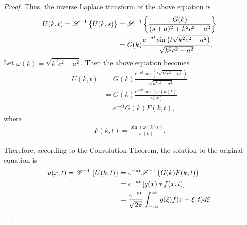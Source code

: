 \begin{proof}
  Thus, the inverse Laplace transform of the above equation is
  \begin{align*}
    U(k, t) = \mathscr{L}^{-1}\left\{ {\bar{U}(k, s)} \right\} &= \mathscr{L}^{-1}\left\{ {\frac{G(k)}{(s+ a)^2 + k^2c^2- a^2 }} \right\} \\
    &= G(k)\frac{e^{-at}\sin\left(t\sqrt{k^2c^2-a^2} \right)}{\sqrt{k^2c^2-a^2}}.
  \end{align*}
  Let $\omega(k) = \sqrt{k^2c^2-a^2}$. Then the above equation becomes
  \begin{align*}
    U(k, t) &= G(k)\frac{e^{-at}\sin\left(t\sqrt{k^2c^2-a^2} \right)}{\sqrt{k^2c^2-a^2}} \\
    &= G(k)\frac{e^{-at}\sin\left(\omega(k) t\right)}{\omega(k)} \\
    &= e^{-at}G(k)F(k, t),
  \end{align*}
  where
  \begin{align*}
    F(k, t) = \frac{\sin\left(\omega(k) t\right)}{\omega(k)}.
  \end{align*}

  Therefore, according to the Convolution Theorem, the solution to the original equation is
  \begin{align*}
    u(x, t) = \mathscr{F}^{-1}\left\{ {U(k, t)} \right\} &= e^{-at}\mathscr{F}^{-1}\left\{ {G(k)F(k, t)} \right\} \\
    &= e^{-at}\left[ g(x) \ast f(x, t) \right]\\
    &= \frac{e^{-at}}{\sqrt{2\pi}} \int_{-\infty}^\infty g(\xi)f(x-\xi, t) d\xi.
  \end{align*}
\end{proof}
\newpage
